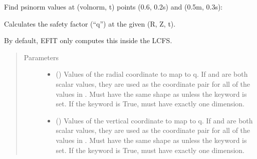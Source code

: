 \documentclass[letterpaper,10pt,english]{sphinxmanual}
\begin{document}
\begin{fulllineitems}
\begin{fulllineitems}
Find psinorm values at (volnorm, t) points (0.6, 0.2s) and (0.5m, 0.3s):

\begin{sphinxVerbatim}[commandchars=\\\{\}]
   \PYG{p}{[} \PYG{p}{]} \PYG{p}{[} \PYG{p}{]} 
\end{sphinxVerbatim}

\end{fulllineitems}


\begin{fulllineitems}
\label{\detokenize{eqtools:eqtools.core.Equilibrium.rz2q}}
Calculates the safety factor (“q”) at the given (R, Z, t).

By default, EFIT only computes this inside the LCFS.
\begin{quote}\begin{description}
\item[{Parameters}] \leavevmode\begin{itemize}
\item {} 
 () \textendash{} Values of the radial coordinate to
map to q. If  and  are both scalar values,
they are used as the coordinate pair for all of the values in
. Must have the same shape as  unless the 
keyword is set. If the  keyword is True,  must
have exactly one dimension.

\item {} 
 () \textendash{} Values of the vertical coordinate to
map to q. If  and  are both scalar values,
they are used as the coordinate pair for all of the values in
. Must have the same shape as  unless the 
keyword is set. If the  keyword is True,  must
have exactly one dimension.


\end{itemize}
\end{description}
\end{quote}
\end{fulllineitems}
\end{fulllineitems}
\end{document}
